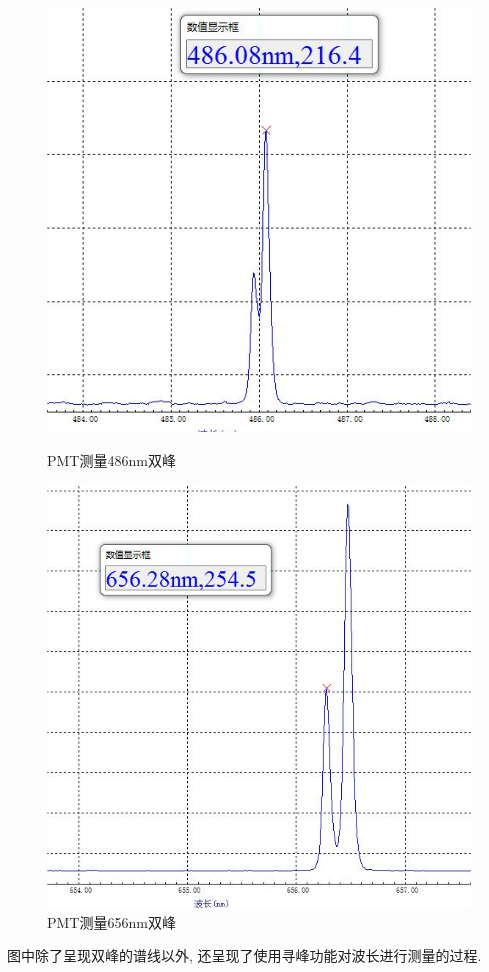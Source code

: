 \documentclass[12pt,a4paper]{article}
\begin{document}
\begin{figure}[htbp]
\begin{minipage}{0.49\linewidth}
	\end{minipage}
	
	\begin{minipage}{0.49\linewidth}
		\centering
		\includegraphics[width=0.9\linewidth]{HD485.png}
		\caption{PMT测量486nm双峰}
		
	\end{minipage}
	\begin{minipage}{0.49\linewidth}
		\centering
		\includegraphics[width=0.9\linewidth]{HD656.png}
		\caption{PMT测量656nm双峰}
		
	\end{minipage}
\end{figure}
图中除了呈现双峰的谱线以外, 还呈现了使用寻峰功能对波长进行测量的过程. 
\end{document}

